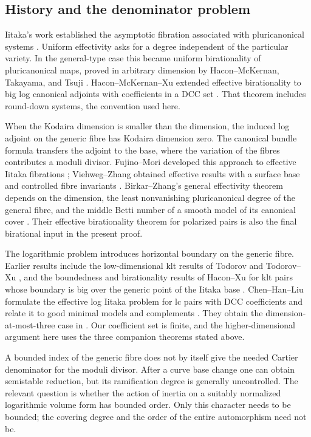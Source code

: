 \subsection{History and the denominator problem}

Iitaka's work established the asymptotic fibration associated with
pluricanonical systems \cite{Iitaka}. Uniform effectivity asks for a
degree independent of the particular variety. In the general-type
case this became uniform birationality of pluricanonical maps,
proved in arbitrary dimension by Hacon--McKernan, Takayama, and
Tsuji \cite{HaconMcKernan,Takayama,Tsuji}.
Hacon--McKernan--Xu extended effective birationality to big log
canonical adjoints with coefficients in a DCC set
\cite[Theorem~1.3]{HMX}. That theorem includes round-down systems,
the convention used here.

When the Kodaira dimension is smaller than the dimension, the
induced log adjoint on the generic fibre has Kodaira dimension zero.
The canonical bundle formula
transfers the adjoint to the base, where the variation of the fibres
contributes a moduli divisor. Fujino--Mori developed this approach
to effective Iitaka fibrations \cite{FujinoMori}; Viehweg--Zhang
obtained effective results with a surface base and controlled fibre
invariants \cite{ViehwegZhang}. Birkar--Zhang's general effectivity
theorem depends on the dimension, the least nonvanishing pluricanonical
degree of the general fibre, and the middle Betti number of a smooth
model of its canonical cover
\cite[Theorem~1.2]{BZ}. Their effective birationality theorem for
polarized pairs \cite[Theorem~1.3]{BZ} is also the final birational
input in the present proof.

The logarithmic problem introduces horizontal boundary on the
generic fibre. Earlier results include the low-dimensional klt
results of Todorov and Todorov--Xu \cite{Todorov,TodorovXu}, and the
boundedness and birationality results of Hacon--Xu for klt pairs whose
boundary is big over the generic point of the Iitaka base
\cite{HaconXu}. Chen--Han--Liu formulate the effective log
Iitaka problem for lc pairs with DCC coefficients and relate it to
good minimal models and complements
\cite[Conjecture~1.2 and Theorem~1.4]{ChenHanLiu}.
They obtain the dimension-at-most-three case in
\cite[Corollary~1.5]{ChenHanLiu}. Our coefficient set is finite,
and the higher-dimensional argument here uses the three companion
theorems stated above.

A bounded index of the generic fibre does not by itself give the
needed Cartier denominator for the moduli divisor. After a curve
base change one can obtain semistable reduction, but its ramification
degree is generally uncontrolled. The relevant question is whether
the action of inertia on a suitably normalized logarithmic volume
form has bounded order. Only this character needs to be bounded;
the covering degree and the order of the entire automorphism need not be.

